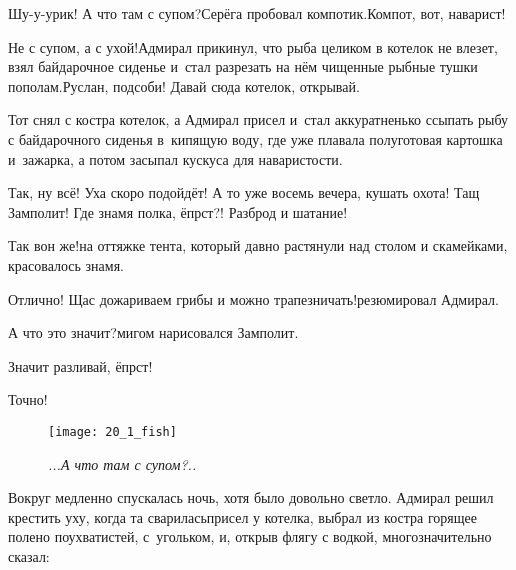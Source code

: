 \diagdash Шу-у-урик! А что там с супом?\mdash Серёга пробовал компотик.\mdash Компот, вот, наварист!

\diagdash Не с супом, а с ухой!\mdash Адмирал прикинул, что рыба целиком в котелок не влезет, взял байдарочное сиденье и~стал разрезать на нём чищенные рыбные тушки пополам.\mdash Руслан, подсоби! Давай сюда котелок, открывай.

Тот снял с костра котелок, а Адмирал присел и~стал аккуратненько ссыпать рыбу с байдарочного сиденья в~кипящую воду, где уже плавала полуготовая картошка и~зажарка, а потом засыпал кус\sdash куса для наваристости.

\diagdash Так, ну всё! Уха скоро подойдёт! А то уже восемь вечера, кушать охота! Тащ Замполит! Где знамя полка, ёпрст?! Разброд и шатание! 


\diagdash Так вон же!\mdash на оттяжке тента, который давно растянули над столом и скамейками, красовалось знамя.

\diagdash Отлично! Щас дожариваем грибы и можно трапезничать!\mdash резюмировал Адмирал.

\diagdash А что это значит?\mdash мигом нарисовался Замполит.

\diagdash Значит разливай, ёпрст!

\diagdash Точно!

\newpage
\begin{figure}[h]
	\centering
	\texttt{[image: 20\_1\_fish]}
	\caption{\small\textit{...А что там с супом?..}}
\end{figure}

Вокруг медленно спускалась ночь, хотя было довольно светло. Адмирал решил крестить уху, когда та сварилась\mdash присел у котелка, выбрал из костра горящее полено поухватистей, с~угольком, и, открыв флягу с водкой, многозначительно сказал:

